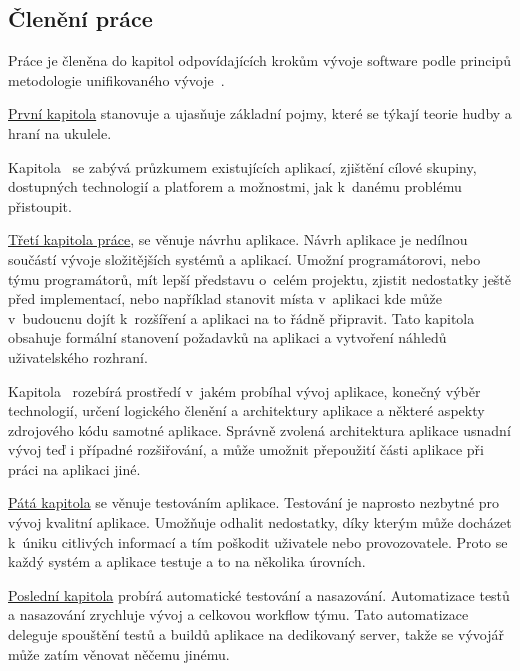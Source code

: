 \begin{introduction}
    \section{Členění práce}
    Práce je členěna do kapitol odpovídajících krokům vývoje software podle principů metodologie unifikovaného vývoje~\cite[s.~51–⁠68]{arlow_2007_uml}.

    \hyperref[ch:glossary]{První kapitola} stanovuje a ujasňuje základní pojmy, které se týkají teorie hudby a hraní na ukulele.

    Kapitola~ se zabývá průzkumem existujících aplikací, zjištění cílové skupiny, dostupných technologií a platforem a možnostmi, jak k~danému problému přistoupit.

    \hyperref[ch:design]{Třetí kapitola práce}, se věnuje návrhu aplikace. Návrh aplikace je nedílnou součástí vývoje složitějších systémů a aplikací. Umožní programátorovi, nebo týmu programátorů, mít lepší představu o~celém projektu, zjistit nedostatky ještě před implementací, nebo například stanovit místa v~aplikaci kde může v~budoucnu dojít k~rozšíření a aplikaci na to řádně připravit. Tato kapitola obsahuje formální stanovení požadavků na aplikaci a vytvoření náhledů uživatelského rozhraní.

    Kapitola~ rozebírá prostředí v~jakém probíhal vývoj aplikace, konečný výběr technologií, určení logického členění a architektury aplikace a některé aspekty zdrojového kódu samotné aplikace. Správně zvolená architektura aplikace usnadní vývoj teď i případné rozšiřování, a může umožnit přepoužití části aplikace při práci na aplikaci jiné.

    \hyperref[ch:testing]{Pátá kapitola} se věnuje testováním aplikace. Testování je naprosto nezbytné pro vývoj kvalitní aplikace. Umožňuje odhalit nedostatky, díky kterým může docházet k~úniku citlivých informací a tím poškodit uživatele nebo provozovatele. Proto se každý systém a aplikace testuje a to na několika úrovních.

    \hyperref[ch:ci_cd]{Poslední kapitola} probírá automatické testování a nasazování. Automatizace testů a nasazování zrychluje vývoj a celkovou workflow týmu. Tato automatizace deleguje spouštění testů a buildů aplikace na dedikovaný server, takže se vývojář může zatím věnovat něčemu jinému.
\end{introduction}